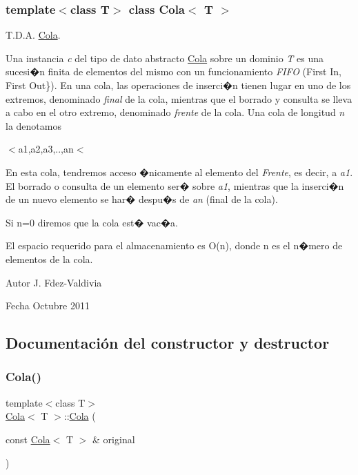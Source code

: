 \subsubsection*{template$<$class T$>$\newline
class Cola$<$ T $>$}

T.\+D.\+A. \hyperlink{classCola}{Cola}. 

Una instancia {\itshape c} del tipo de dato abstracto \hyperlink{classCola}{Cola} sobre un dominio {\itshape T} es una sucesi�n finita de elementos del mismo con un funcionamiento {\itshape F\+I\+FO} (First In, First Out\}). En una cola, las operaciones de inserci�n tienen lugar en uno de los extremos, denominado {\itshape final} de la cola, mientras que el borrado y consulta se lleva a cabo en el otro extremo, denominado {\itshape frente} de la cola. Una cola de longitud {\itshape n} la denotamos


\begin{DoxyItemize}
\item $<$a1,a2,a3,..,an$<$
\end{DoxyItemize}

En esta cola, tendremos acceso �nicamente al elemento del {\itshape Frente}, es decir, a {\itshape a1}. El borrado o consulta de un elemento ser� sobre {\itshape a1}, mientras que la inserci�n de un nuevo elemento se har� despu�s de {\itshape an} (final de la cola).

Si n=0 diremos que la cola est� vac�a.

El espacio requerido para el almacenamiento es O(n), donde n es el n�mero de elementos de la cola.

\begin{DoxyAuthor}{Autor}
J. Fdez-\/\+Valdivia 
\end{DoxyAuthor}
\begin{DoxyDate}{Fecha}
Octubre 2011 
\end{DoxyDate}


\subsection{Documentación del constructor y destructor}
\mbox{\label{classCola_a2249ab5603a92fddb8bd9bb55abeaa24}} 
\subsubsection{\texorpdfstring{Cola()}{Cola()}}
{\footnotesize\ttfamily template$<$class T$>$ \\
\hyperlink{classCola}{Cola}$<$ T $>$\+::\hyperlink{classCola}{Cola} (\begin{DoxyParamCaption}\item[{const \hyperlink{classCola}{Cola}$<$ T $>$ \&}]{original }\end{DoxyParamCaption})}



